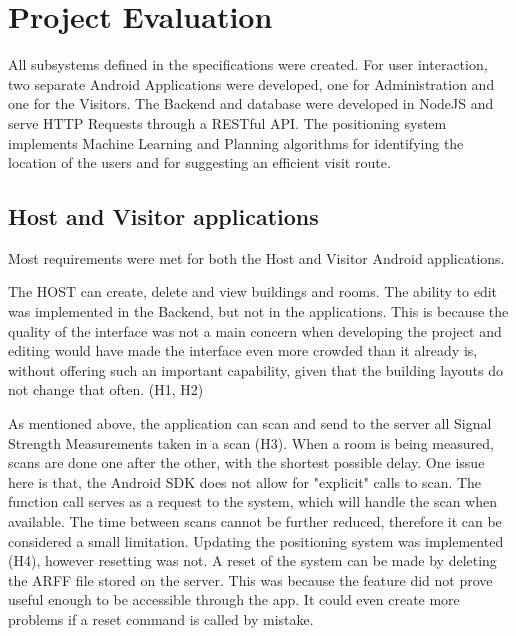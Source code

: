 \section{Project Evaluation}
All subsystems defined in the specifications were created. For user interaction, two separate Android Applications were developed, one for Administration and one for the Visitors. The Backend and database were developed in NodeJS and serve HTTP Requests through a RESTful API. The positioning system implements Machine Learning and Planning algorithms for identifying the location of the users and for suggesting an efficient visit route.

\subsection{Host and Visitor applications}
Most requirements were met for both the Host and Visitor Android applications. 

The HOST can create, delete and view buildings and rooms. The ability to edit was implemented in the Backend, but not in the applications. This is because the quality of the interface was not a main concern when developing the project and editing would have made the interface even more crowded than it already is, without offering such an important capability, given that the building layouts do not change that often. (H1, H2)

As mentioned above, the application can scan and send to the server all Signal Strength Measurements taken in a scan (H3). When a room is being measured, scans are done one after the other, with the shortest possible delay. One issue here is that, the Android SDK does not allow for "explicit" calls to scan. The function call serves as a request to the system, which will handle the scan when available. The time between scans cannot be further reduced, therefore it can be considered a small limitation. Updating the positioning system was implemented (H4), however resetting was not. A reset of the system can be made by deleting the ARFF file stored on the server. This was because the feature did not prove useful enough to be accessible through the app. It could even create more problems if a reset command is called by mistake. 

